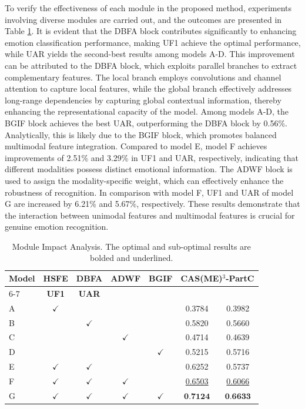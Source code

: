 \documentclass[lettersize,journal]{IEEEtran}
\begin{document}
To verify the effectiveness of each module in the proposed method, experiments involving diverse modules are carried out, and the outcomes are presented in Table \ref{tab:table6}. It is evident that the DBFA block contributes significantly to enhancing emotion classification performance, making UF1 achieve the optimal performance, while UAR yields the second-best results among models A-D. This improvement can be attributed to the DBFA block, which exploits parallel branches to extract complementary features. The local branch employs convolutions and channel attention to capture local features, while the global branch effectively addresses long-range dependencies by capturing global contextual information, thereby enhancing the representational capacity of the model. Among models A-D, the BGIF block achieves the best UAR, outperforming the DBFA block by 0.56\%. Analytically, this is likely due to the BGIF block, which promotes balanced multimodal feature integration. Compared to model E, model F achieves improvements of 2.51\% and 3.29\% in UF1 and UAR, respectively, indicating that different modalities possess distinct emotional information. The ADWF block is used to assign the modality-specific weight, which can effectively enhance the robustness of recognition. In comparison with model F, UF1 and UAR of model G are increased by 6.21\% and 5.67\%, respectively. These results demonstrate that the interaction between unimodal features and multimodal features is crucial for genuine emotion recognition.

\begin{table}[!t]
\caption{Module Impact Analysis. The optimal and sub-optimal results are bolded and underlined.\label{tab:table6}}
\centering
\begin{tabular}{l *{6}{c}}
\toprule[1.5pt]
\multirow{2}{*}{\textbf{Model}} & \multirow{2}{*}{\textbf{HSFE}} & \multirow{2}{*}{\textbf{DBFA}} & \multirow{2}{*}{\textbf{ADWF}} & \multirow{2}{*}{\textbf{BGIF}} & \multicolumn{2}{c}{\textbf{CAS(ME)$^{3}$-PartC}} \\
\cmidrule[1pt]{6-7}
\multicolumn{5}{c}{} & \textbf{UF1} & \textbf{UAR} \\ \midrule[1pt]

A   & $\checkmark$ &  &  &  & 0.3784 & 0.3982 \\
B   &  & $\checkmark$ &  &  & 0.5820 & 0.5660 \\
C   &  &  & $\checkmark$ &  & 0.4714 & 0.4639 \\
D   &  &  &  & $\checkmark$ & 0.5215 & 0.5716 \\
E   & $\checkmark$ & $\checkmark$ &  &  & 0.6252 & 0.5737 \\
F   & $\checkmark$ & $\checkmark$ & $\checkmark$ &  & \underline{0.6503} & \underline{0.6066} \\
G   & $\checkmark$ & $\checkmark$ & $\checkmark$ & $\checkmark$ & $\textbf{0.7124}$ & $\textbf{0.6633}$ \\
\bottomrule[1.5pt]
\end{tabular}
\end{table}
\end{document}

